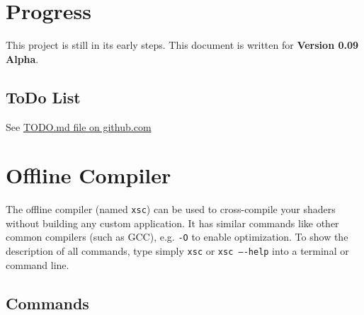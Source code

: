 \documentclass{article}
\begin{document}

\newpage
\section{Progress}

This project is still in its early steps. This document is written for \XSC \textbf{Version 0.09 Alpha}.

\subsection{ToDo List}
See \href{https://github.com/LukasBanana/XShaderCompiler/blob/master/TODO.md}{TODO.md file on github.com}



\newpage
\section{Offline Compiler}

The offline compiler (named \texttt{xsc}) can be used to cross-compile your shaders without building any custom application.
It has similar commands like other common compilers (such as GCC), e.g. \texttt{-O} to enable optimization.
To show the description of all commands, type simply \texttt{xsc} or \texttt{xsc ----help} into a terminal or command line.

\subsection{Commands}
\end{document}
